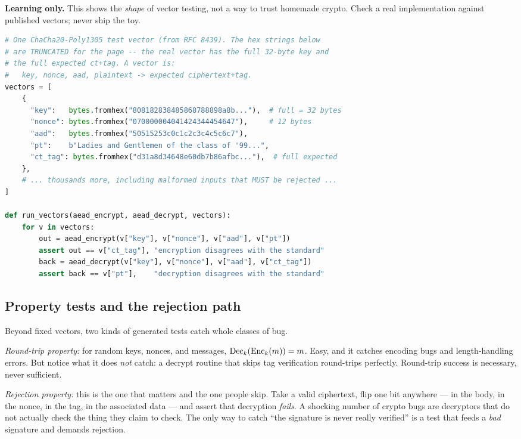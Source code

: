 \begin{implementbox}
\textbf{Learning only.} This shows the \emph{shape} of vector testing, not a way to
trust homemade crypto. Check a real implementation against published vectors; never
ship the toy.
\begin{lstlisting}[language=Python, caption={Running a known-answer vector. Real
suites have thousands of these, including deliberately malformed inputs.}]
# One ChaCha20-Poly1305 test vector (from RFC 8439). The hex strings below
# are TRUNCATED for the page -- the real vector has the full 32-byte key and
# the full expected ct+tag. A vector is:
#   key, nonce, aad, plaintext -> expected ciphertext+tag.
vectors = [
    {
      "key":   bytes.fromhex("808182838485868788898a8b..."),  # full = 32 bytes
      "nonce": bytes.fromhex("070000004041424344454647"),     # 12 bytes
      "aad":   bytes.fromhex("50515253c0c1c2c3c4c5c6c7"),
      "pt":    b"Ladies and Gentlemen of the class of '99...",
      "ct_tag": bytes.fromhex("d31a8d34648e60db7b86afbc..."),  # full expected
    },
    # ... thousands more, including malformed inputs that MUST be rejected ...
]

def run_vectors(aead_encrypt, aead_decrypt, vectors):
    for v in vectors:
        out = aead_encrypt(v["key"], v["nonce"], v["aad"], v["pt"])
        assert out == v["ct_tag"], "encryption disagrees with the standard"
        back = aead_decrypt(v["key"], v["nonce"], v["aad"], v["ct_tag"])
        assert back == v["pt"],    "decryption disagrees with the standard"
\end{lstlisting}
\end{implementbox}

\subsection{Property tests and the rejection path}

Beyond fixed vectors, two kinds of generated tests catch whole classes of bug.

\emph{Round-trip property:} for random keys, nonces, and messages,
$\operatorname{Dec}_k(\operatorname{Enc}_k(m)) = m$. Easy, and it catches encoding bugs and length-handling
errors. But notice what it does \emph{not} catch: a decrypt routine that skips tag
verification round-trips perfectly. Round-trip success is necessary, never
sufficient.

\emph{Rejection property:} this is the one that matters and the one people skip.
Take a valid ciphertext, flip one bit anywhere --- in the body, in the nonce, in
the tag, in the associated data --- and assert that decryption \emph{fails}. A
shocking number of crypto bugs are decryptors that do not actually check the thing
they claim to check. The only way to catch ``the signature is never really
verified'' is a test that feeds a \emph{bad} signature and demands rejection.

